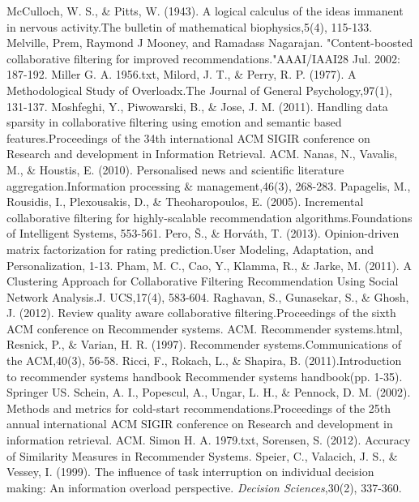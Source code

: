 \documentclass[12pt]{article}
\begin{document}
\begin{thebibliography}{100}
 McCulloch, W. S., \& Pitts, W. (1943). A logical calculus of the ideas immanent in nervous activity.The bulletin of mathematical biophysics,5(4), 115-133.
 Melville, Prem, Raymond J Mooney, and Ramadass Nagarajan. "Content-boosted collaborative filtering for improved recommendations."AAAI/IAAI28 Jul. 2002: 187-192.
 Miller G. A. 1956.txt,
 Milord, J. T., \& Perry, R. P. (1977). A Methodological Study of Overloadx.The Journal of General Psychology,97(1), 131-137.
 Moshfeghi, Y., Piwowarski, B., \& Jose, J. M. (2011). Handling data sparsity in collaborative filtering using emotion and semantic based features.Proceedings of the 34th international ACM SIGIR conference on Research and development in Information Retrieval. ACM.
 Nanas, N., Vavalis, M., \& Houstis, E. (2010). Personalised news and scientific literature aggregation.Information processing \& management,46(3), 268-283.
 Papagelis, M., Rousidis, I., Plexousakis, D., \& Theoharopoulos, E. (2005). Incremental collaborative filtering for highly-scalable recommendation algorithms.Foundations of Intelligent Systems, 553-561.
 Pero, Š., \& Horváth, T. (2013). Opinion-driven matrix factorization for rating prediction.User Modeling, Adaptation, and Personalization, 1-13.
 Pham, M. C., Cao, Y., Klamma, R., \& Jarke, M. (2011). A Clustering Approach for Collaborative Filtering Recommendation Using Social Network Analysis.J. UCS,17(4), 583-604.
 Raghavan, S., Gunasekar, S., \& Ghosh, J. (2012). Review quality aware collaborative filtering.Proceedings of the sixth ACM conference on Recommender systems. ACM.
 Recommender systems.html,
 Resnick, P., \& Varian, H. R. (1997). Recommender systems.Communications of the ACM,40(3), 56-58.
 Ricci, F., Rokach, L., \& Shapira, B. (2011).Introduction to recommender systems handbook Recommender systems handbook(pp. 1-35). Springer US.
 Schein, A. I., Popescul, A., Ungar, L. H., \& Pennock, D. M. (2002). Methods and metrics for cold-start recommendations.Proceedings of the 25th annual international ACM SIGIR conference on Research and development in information retrieval. ACM.
 Simon H. A. 1979.txt,
 Sorensen, S. (2012). Accuracy of Similarity Measures in Recommender Systems.
 Speier, C., Valacich, J. S., \& Vessey, I. (1999). The influence of task interruption on individual decision making: An information overload perspective. \textit{Decision Sciences},30(2), 337-360.

\end{thebibliography}
\end{document}
